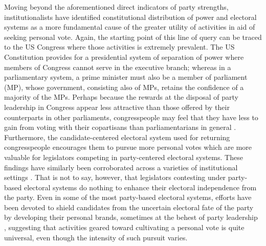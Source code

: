 \documentclass[hyphens, crop=false]{standalone}
\begin{document}
		
		Moving beyond the aforementioned direct indicators of party strengths,
		institutionalists have identified constitutional distribution of power and electoral systems
		\autocite{careyIncentivesCultivatePersonal1995,	finocchiaroMakingWashingtonWork2018}
		as a more fundamental cause of the greater utility of activities in aid of seeking personal vote.
		Again,
		the starting point of this line of query can be traced to the US Congress where those activities is extremely prevalent.
		The US Constitution provides for a presidential system of separation of power where members of Congress cannot serve in the executive branch; whereas in a parliamentary system,
		a prime minister must also be a member of parliament (MP),
		whose government,
		consisting also of MPs,
		retains the confidence of a majority of the MPs.
		Perhaps because the rewards at the disposal of party leadership in Congress appear less attractive than those offered by their counterparts in other parliaments,
		congresspeople may feel that they have less to gain from voting with their copartisans than parliamentarians in general
		\autocite{cainPersonalVoteConstituency1987}.
		Furthermore,
		the candidate-centered electoral system used for returning congresspeople encourages them to pursue more personal votes which are more valuable for legislators competing in party-centered electoral systems.
		These findings have similarly been corroborated across a varieties of institutional settings
		\autocite{careyIncentivesCultivatePersonal1995}.
		That is not to say,
		however,
		that legislators contesting under party-based electoral systems do nothing to enhance their electoral independence from the party.
		Even in some of the most party-based electoral systems,
		efforts have been devoted to shield candidates from the uncertain electoral fate of the party by developing their personal brands,
		sometimes at the behest of party leadership
		\autocite{shugartLookingLocalsVoter2005},
		suggesting that activities geared toward cultivating a personal vote is quite universal,
		even though the intensity of such pursuit varies.
		
\end{document}
